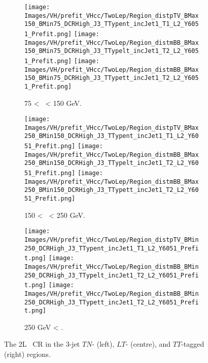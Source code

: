 \begin{figure}[h!]
    \centering
    \begin{subfigure}[b]{\textwidth}
        \centering
        \texttt{[image: Images/VH/prefit\_VHcc/TwoLep/Region\_distpTV\_BMax150\_BMin75\_DCRHigh\_J3\_TTypent\_incJet1\_T1\_L2\_Y6051\_Prefit.png]}
        \texttt{[image: Images/VH/prefit\_VHcc/TwoLep/Region\_distmBB\_BMax150\_BMin75\_DCRHigh\_J3\_TTypelt\_incJet1\_T2\_L2\_Y6051\_Prefit.png]}
        \texttt{[image: Images/VH/prefit\_VHcc/TwoLep/Region\_distmBB\_BMax150\_BMin75\_DCRHigh\_J3\_TTypett\_incJet1\_T2\_L2\_Y6051\_Prefit.png]}
        \caption{75 < \ptv\ < 150 GeV.}
        \label{fig:plots_VHcc_2L_75_CRH_3J}
    \end{subfigure}
    \begin{subfigure}[b]{\textwidth}
        \centering
        \texttt{[image: Images/VH/prefit\_VHcc/TwoLep/Region\_distpTV\_BMax250\_BMin150\_DCRHigh\_J3\_TTypent\_incJet1\_T1\_L2\_Y6051\_Prefit.png]}
        \texttt{[image: Images/VH/prefit\_VHcc/TwoLep/Region\_distmBB\_BMax250\_BMin150\_DCRHigh\_J3\_TTypelt\_incJet1\_T2\_L2\_Y6051\_Prefit.png]}
        \texttt{[image: Images/VH/prefit\_VHcc/TwoLep/Region\_distmBB\_BMax250\_BMin150\_DCRHigh\_J3\_TTypett\_incJet1\_T2\_L2\_Y6051\_Prefit.png]}
        \caption{150 < \ptv\ < 250 GeV.}
        \label{fig:plots_VHcc_2L_150_CRH_3J}
    \end{subfigure}
    \begin{subfigure}[b]{\textwidth}
        \centering
        \texttt{[image: Images/VH/prefit\_VHcc/TwoLep/Region\_distpTV\_BMin250\_DCRHigh\_J3\_TTypent\_incJet1\_T1\_L2\_Y6051\_Prefit.png]}
        \texttt{[image: Images/VH/prefit\_VHcc/TwoLep/Region\_distmBB\_BMin250\_DCRHigh\_J3\_TTypelt\_incJet1\_T2\_L2\_Y6051\_Prefit.png]}
        \texttt{[image: Images/VH/prefit\_VHcc/TwoLep/Region\_distmBB\_BMin250\_DCRHigh\_J3\_TTypett\_incJet1\_T2\_L2\_Y6051\_Prefit.png]}
        \caption{250 GeV < \ptv.}
        \label{fig:plots_VHcc_2L_250_CRH_3J}
    \end{subfigure}
    \caption{The 2L \highdr\ CR in the 3-jet $TN$- (left), $LT$- (centre), and $TT$-tagged (right) regions.}
    \label{fig:plots_VHcc_2L_CRH_3J}
\end{figure}

\vspace*{\fill} \newpage
\vspace*{\fill} 

